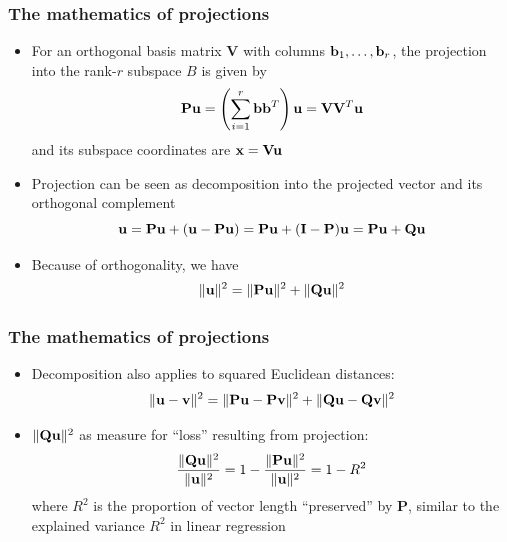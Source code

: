 \documentclass[t]{beamer} %
\begin{document}
\begin{frame}
  \frametitle{The mathematics of projections}

  \begin{itemize}
  \item For an orthogonal basis matrix $\mathbf{V}$ with columns
    $\vb_1, \ldots, \vb_r$, the projection into the rank-$r$ subspace $B$ is
    given by
    \[
      \mathbf{P}\vu = \left(\sum_{i=1}^r \vb \vb^T\right) \vu
      = \mathbf{V} \mathbf{V}^T \vu
    \]
    and its subspace coordinates are $\vx = \mathbf{V} \mathbf{u}$
  \item<2-> Projection can be seen as decomposition into the projected vector
    and its orthogonal complement
    \[
      \vu = \mathbf{P} \vu + (\vu - \mathbf{P} \vu)
      = \mathbf{P} \vu + (\mathbf{I} - \mathbf{P}) \vu
      = \mathbf{P} \vu + \mathbf{Q} \vu
    \]
  \item<3-> Because of orthogonality, we have
    \[
      \norm{\vu}^2 = \norm{\mathbf{P} \vu}^2 + \norm{\mathbf{Q} \vu}^2
    \]
  \end{itemize}
\end{frame}

\begin{frame}
  \frametitle{The mathematics of projections}

  \begin{itemize}
  \item Decomposition also applies to squared Euclidean distances:
    \[
      \norm{\vu - \vv}^2 = \norm{\mathbf{P} \vu - \mathbf{P} \vv}^2 + \norm{\mathbf{Q} \vu - \mathbf{Q} \vv}^2
    \]
  \item<2-> $\norm{\mathbf{Q}\vu}^2$ as measure for ``loss'' resulting from projection:
    \[
      \frac{\norm{\mathbf{Q}\vu}^2}{\norm{\vu}^2}
      = 1 - \frac{\norm{\mathbf{P}\vu}^2}{\norm{\vu}^2}
      = 1 - R^2
    \]
    where $R^2$ is the proportion of vector length ``preserved'' by
    $\mathbf{P}$, similar to the explained variance $R^2$ in linear regression
  \end{itemize}  
\end{frame}
\end{document}
